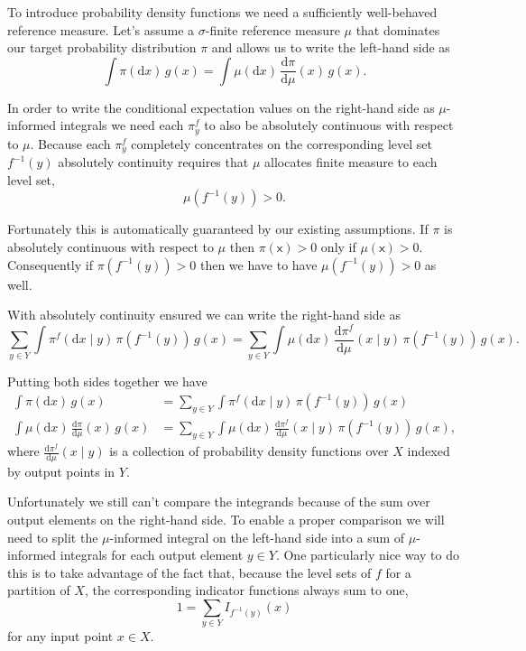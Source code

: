 \documentclass[
  letterpaper,
  DIV=11,
  numbers=noendperiod]{scrartcl}
\begin{document}
To introduce probability density functions we need a sufficiently
well-behaved reference measure. Let's assume a \(\sigma\)-finite
reference measure \(\mu\) that dominates our target probability
distribution \(\pi\) and allows us to write the left-hand side as \[
\int \pi( \mathrm{d} x ) \, g(x)
=
\int \mu( \mathrm{d} x ) \, \frac{ \mathrm{d}  \pi }{ \mathrm{d}  \mu  }(x) \, g(x).
\]

In order to write the conditional expectation values on the right-hand
side as \(\mu\)-informed integrals we need each \(\pi^{f}_{y}\) to also
be absolutely continuous with respect to \(\mu\). Because each
\(\pi^{f}_{y}\) completely concentrates on the corresponding level set
\(f^{-1}(y)\) absolutely continuity requires that \(\mu\) allocates
finite measure to each level set, \[
\mu( f^{-1}(y) ) > 0.
\]

Fortunately this is automatically guaranteed by our existing
assumptions. If \(\pi\) is absolutely continuous with respect to \(\mu\)
then \(\pi(\mathsf{x}) > 0\) only if \(\mu(\mathsf{x}) > 0\).
Consequently if \(\pi( f^{-1}(y) ) > 0\) then we have to have
\(\mu( f^{-1}(y) ) > 0\) as well.

With absolutely continuity ensured we can write the right-hand side as
\[
\sum_{y \in Y} \int \pi^{f}( \mathrm{d} x \mid y ) \,
\pi ( f^{-1}(y) ) \, g(x)
=
\sum_{y \in Y} \int \mu( \mathrm{d} x) \,
\frac{ \mathrm{d}  \pi^{f} }{ \mathrm{d}  \mu  }( x \mid y ) \,
\pi ( f^{-1}(y) ) \, g(x).
\]

Putting both sides together we have \begin{align*}
\int \pi( \mathrm{d} x ) \, g(x)
&=
\sum_{y \in Y} \int \pi^{f}( \mathrm{d} x \mid y ) \,
\pi ( f^{-1}(y) ) \, g(x)
\\
\int \mu( \mathrm{d} x ) \, \frac{ \mathrm{d}  \pi }{ \mathrm{d}  \mu  }(x) \, g(x)
&=
\sum_{y \in Y} \int \mu( \mathrm{d} x) \,
\frac{ \mathrm{d}  \pi^{f} }{ \mathrm{d}  \mu  }( x \mid y ) \,
\pi ( f^{-1}(y) ) \, g(x),
\end{align*} where
\(\frac{ \mathrm{d}  \pi^{f} }{ \mathrm{d}  \mu  }( x \mid y )\) is a
collection of probability density functions over \(X\) indexed by output
points in \(Y\).

Unfortunately we still can't compare the integrands because of the sum
over output elements on the right-hand side. To enable a proper
comparison we will need to split the \(\mu\)-informed integral on the
left-hand side into a sum of \(\mu\)-informed integrals for each output
element \(y \in Y\). One particularly nice way to do this is to take
advantage of the fact that, because the level sets of \(f\) for a
partition of \(X\), the corresponding indicator functions always sum to
one, \[
1 = \sum_{y \in Y} I_{f^{-1}(y)}(x)
\] for any input point \(x \in X\).
\end{document}
